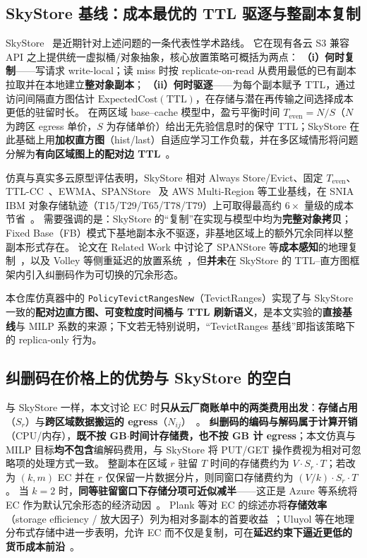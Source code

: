 \documentclass[conference]{IEEEtran}
\begin{document}
\subsection{SkyStore 基线：成本最优的 TTL 驱逐与整副本复制}

SkyStore~\cite{skystore2025} 是近期针对上述问题的一条代表性学术路线。
它在现有各云 S3 兼容 API 之上提供统一虚拟桶/对象抽象，核心放置策略可概括为两点：
\textbf{（i）何时复制}——写请求 write-local；读 miss 时按 replicate-on-read 从费用最低的已有副本拉取并在本地建立\textbf{整对象副本}；
\textbf{（ii）何时驱逐}——为每个副本赋予 TTL，通过访问间隔直方图估计 $\mathrm{ExpectedCost}(\mathrm{TTL})$，在存储与潜在再传输之间选择成本更低的驻留时长。
在两区域 base--cache 模型中，盈亏平衡时间 $T_{\mathrm{even}}=N/S$（$N$ 为跨区 egress 单价，$S$ 为存储单价）给出无先验信息时的保守 TTL；SkyStore 在此基础上用\textbf{加权直方图}（hist/last）自适应学习工作负载，并在多区域情形将问题分解为\textbf{有向区域图上的配对边 TTL}~\cite{skystore2025}。

仿真与真实多云原型评估表明，SkyStore 相对 Always Store/Evict、固定 $T_{\mathrm{even}}$、TTL-CC~\cite{ttl_cc2019}、EWMA、SPANStore~\cite{spanstore2013} 及 AWS Multi-Region 等工业基线，在 SNIA IBM 对象存储轨迹（T15/T29/T65/T78/T79）上可取得最高约 $6\times$ 量级的成本节省~\cite{skystore2025,snia_ibm2019}。
需要强调的是：SkyStore 的``复制''在实现与模型中均为\textbf{完整对象拷贝}；Fixed Base（FB）模式下基地副本永不驱逐，非基地区域上的额外冗余同样以整副本形式存在。
论文在 Related Work 中讨论了 SPANStore 等\textbf{成本感知}的地理复制~\cite{spanstore2013}，以及 Volley 等侧重延迟的放置系统~\cite{volley2010}，但\textbf{并未}在 SkyStore 的 TTL--直方图框架内引入纠删码作为可切换的冗余形态。

本仓库仿真器中的 \texttt{PolicyTevictRangesNew}（TevictRanges）实现了与 SkyStore 一致的\textbf{配对边直方图、可变粒度时间桶与 TTL 刷新语义}，是本文实验的\textbf{直接基线}与 MILP 系数的来源；下文若无特别说明，``TevictRanges 基线''即指该策略下的 replica-only 行为。

\subsection{纠删码在价格上的优势与 SkyStore 的空白}

与 SkyStore 一样，本文讨论 EC 时\textbf{只从云厂商账单中的两类费用出发}：\textbf{存储占用}（$S_r$）与\textbf{跨区域数据搬运的 egress}（$N_{ij}$）~\cite{skystore2025}。
\textbf{纠删码的编码与解码属于计算开销}（CPU/内存），\textbf{既不按 GB$\cdot$时间计存储费，也不按 GB 计 egress}；本文仿真与 MILP 目标\textbf{均不包含}编解码费用，与 SkyStore 将 PUT/GET 操作费视为相对可忽略项的处理方式一致。
整副本在区域 $r$ 驻留 $T$ 时间的存储费约为 $V{\cdot}S_r{\cdot}T$；若改为 $(k,m)$ EC 并在 $r$ 仅保留一片数据分片，则同窗口存储费约为 $(V/k){\cdot}S_r{\cdot}T$。
当 $k{=}2$ 时，\textbf{同等驻留窗口下存储分项可近似减半}——这正是 Azure 等系统将 EC 作为默认冗余形态的经济动因~\cite{azure_ec2012}。
Plank 等对 EC 的综述亦将\textbf{存储效率}（storage efficiency / 放大因子）列为相对多副本的首要收益~\cite{plank2013}；Uluyol 等在地理分布式存储中进一步表明，允许 EC 而不仅是复制，可在\textbf{延迟约束下逼近更低的货币成本前沿}~\cite{uluyol2020}。
\end{document}
